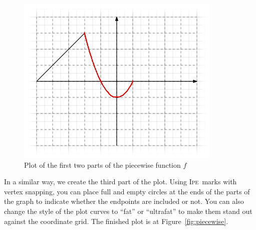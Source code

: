 \documentclass{article}
\def\Ipe{\textsc{Ipe}}
\begin{document}
\begin{figure}[h]
   \begin{center}
      \includegraphics[scale=2]{secondline.png}
   \end{center}
   \caption{Plot of the first two parts of the piecewise function $f$}
   \label{fig:secondline}
\end{figure}

In a similar way, we create the third part of the plot.  Using \Ipe\ marks with
vertex snapping, you can place full and empty circles at the ends of the parts
of the graph to indicate whether the endpoints are included or not.  You can
also change the style of the plot curves to ``fat'' or ``ultrafat'' to make
them stand out against the coordinate grid.  The finished plot is at
Figure~\ref{fig:piecewise}. 
\end{document}
